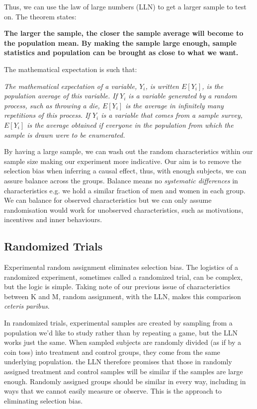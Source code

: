 \documentclass[12pt, letterpaper]{article}
\begin{document}
{\vspace{10pt}
\noindent Thus, we can use the law of large numbers (LLN) to get a larger sample to test on. The theorem states:
\begin{center}
	\textbf{The larger the sample, the closer the sample average will become to the population mean. By making the sample large enough, sample statistics and population can be brought as close to what we want.}
\end{center}
The mathematical expectation is such that:
\begin{center}
\textit{The mathematical expectation of a variable, $Y_i$, is written $E[Y_i]$, is the population average of this variable. If $Y_i$ is a variable generated by a random process, such as throwing a die, $E[Y_i]$ is the average in infinitely many repetitions of this process. If $Y_i$ is a variable that comes from a sample survey, $E[Y_i]$ is the average obtained if everyone in the population from which the sample is drawn were to be enumerated.}
\end{center}
By having a large sample, we can wash out the random characteristics within our sample size making our experiment more indicative. Our aim is to remove the selection bias when inferring a causal effect, thus, with enough subjects, we can assure balance across the groups. Balance means no \textit{systematic differences} in characteristics e.g. we hold a similar fraction of men and women in each group. We can balance for observed characteristics but we can only assume randomisation would work for unobserved characteristics, such as motivations, incentives and inner behaviours.

\subsection{Randomized Trials}
Experimental random assignment eliminates selection bias. The logistics of a randomized experiment, sometimes called a randomized trial, can be complex, but the logic is simple. Taking note of our previous issue of characteristics between K and M, random assignment, with the LLN, makes this comparison \textit{ceteris paribus}.

\vspace{10pt}
\noindent In randomized trials, experimental samples are created by sampling from a population we'd like to study rather than by repeating a game, but the LLN works just the same. When sampled subjects are randomly divided (as if by a coin toss) into treatment and control groups, they come from the same underlying population. the LLN therefore promises that those in randomly assigned treatment and control samples will be similar if the samples are large enough. Randomly assigned groups should be similar in every way, including in ways that we cannot easily measure or observe. This is the approach to eliminating selection bias.

}
\end{document}
